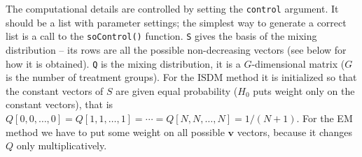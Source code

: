 \documentclass[reqno]{amsart}
\newcommand{\bv}{\mathbf{v}}
\begin{document}
The computational details are controlled by setting the \texttt{control} argument.
It should be a list with parameter settings; the simplest way to generate a correct
list is a call to the \texttt{soControl()} function.
\texttt{S} gives the basis of the mixing distribution -- its rows are all the
possible non-decreasing vectors (see below for how it is obtained). \texttt{Q}
is the mixing distribution, it is a $G$-dimensional matrix ($G$ is the number 
of treatment groups). For the ISDM method it is initialized so that the constant vectors of $S$
are given equal probability ($H_0$ puts weight only on the constant vectors),
that is $Q[0,0,\ldots,0]= Q[1,1,\ldots,1]= \cdots =Q[N,N,\ldots,N]=1/(N+1)$. For
the EM method we have to put some weight on all possible $\bv$ vectors, because
it changes $Q$ only multiplicatively.
    
\end{document}
